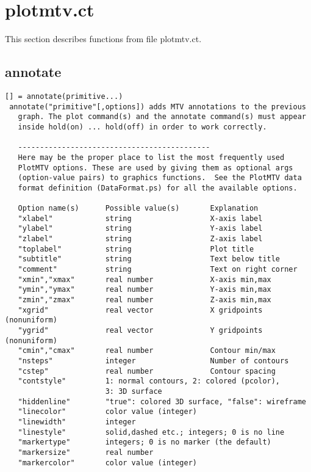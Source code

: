 \documentclass[a4paper]{article}
\begin{document}
\section{plotmtv.ct}

This section describes functions from file plotmtv.ct.




\subsection{annotate\label{annotate}}

\begin{tscreen}
\begin{verbatim}
[] = annotate(primitive...)
 annotate("primitive"[,options]) adds MTV annotations to the previous
   graph. The plot command(s) and the annotate command(s) must appear
   inside hold(on) ... hold(off) in order to work correctly.
   
   --------------------------------------------
   Here may be the proper place to list the most frequently used
   PlotMTV options. These are used by giving them as optional args
   (option-value pairs) to graphics functions.  See the PlotMTV data
   format definition (DataFormat.ps) for all the available options.
   
   Option name(s)      Possible value(s)       Explanation
   "xlabel"            string                  X-axis label
   "ylabel"            string                  Y-axis label
   "zlabel"            string                  Z-axis label
   "toplabel"          string                  Plot title
   "subtitle"          string                  Text below title
   "comment"           string                  Text on right corner
   "xmin","xmax"       real number             X-axis min,max
   "ymin","ymax"       real number             Y-axis min,max
   "zmin","zmax"       real number             Z-axis min,max
   "xgrid"             real vector             X gridpoints (nonuniform)
   "ygrid"             real vector             Y gridpoints (nonuniform)
   "cmin","cmax"       real number             Contour min/max
   "nsteps"            integer                 Number of contours
   "cstep"             real number             Contour spacing
   "contstyle"         1: normal contours, 2: colored (pcolor),
                       3: 3D surface
   "hiddenline"        "true": colored 3D surface, "false": wireframe
   "linecolor"         color value (integer)
   "linewidth"         integer
   "linestyle"         solid,dashed etc.; integers; 0 is no line
   "markertype"        integers; 0 is no marker (the default)
   "markersize"        real number
   "markercolor"       color value (integer)
   

\end{verbatim}
\end{tscreen}
\end{document}
